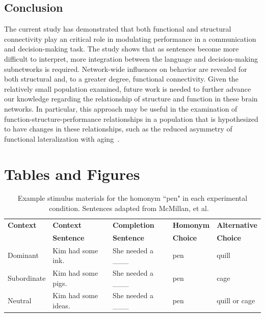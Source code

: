 \subsection{Conclusion}
The current study has demonstrated that both functional and structural connectivity play an critical role in modulating performance in a communication and decision-making task. The study shows that as sentences become more difficult to interpret, more integration between the language and decision-making subnetworks is required. Network-wide influences on behavior are revealed for both structural and, to a greater degree, functional connectivity. Given the relatively small population examined, future work is needed to further advance our knowledge regarding the relationship of structure and function in these brain networks. In particular, this approach may be useful in the examination of function-structure-performance relationships in a population that is hypothesized to have changes in these relationships, such as the reduced asymmetry of functional lateralization with aging~\cite{Cabeza2002}.

%


\section{Tables and Figures}
\begin{table}[h]
\begin{center}
\footnotesize{
\begin{tabular}{| l | l | l | l | l | }
\hline
{\bf Context} & {\bf Context} & {\bf Completion} & {\bf Homonym} & {\bf Alternative} \\
& {\bf Sentence} & {\bf Sentence} & {\bf Choice} & {\bf Choice}\\
\hline
Dominant & Kim had some ink. &  She needed a \_\_\_ & pen & quill\\
Subordinate & Kim had some pigs. & She needed a \_\_\_ & pen & cage\\
Neutral & Kim had some ideas. & She needed a \_\_\_ & pen & quill or cage\\
\hline
\end{tabular}
}
\caption{Example stimulus materials for the homonym ``pen" in each experimental condition. Sentences adapted from McMillan, et al.\ ~\cite{McMillan2010}}
\label{sentences}
\end{center}
\end{table}

